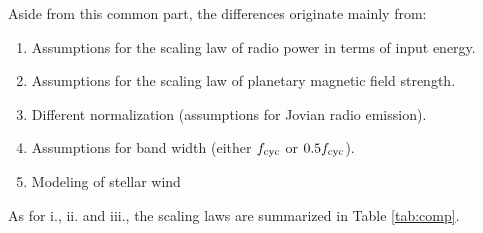 \documentclass{emulateapj}
\begin{document}
Aside from this common part, the differences originate mainly from:
\renewcommand{\theenumi}{\roman{enumi}}
\begin{enumerate}
\item Assumptions for the scaling law of radio power in terms of input energy. 
\item Assumptions for the scaling law of planetary magnetic field strength. 
\item Different normalization (assumptions for Jovian radio emission). 
\item Assumptions for band width (either $f_{\rm cyc}$ or $0.5f_{\rm cyc}$). 
\item Modeling of stellar wind
\end{enumerate}

As for i., ii. and iii., the scaling laws are summarized in Table \ref{tab:comp}. 
\end{document}
